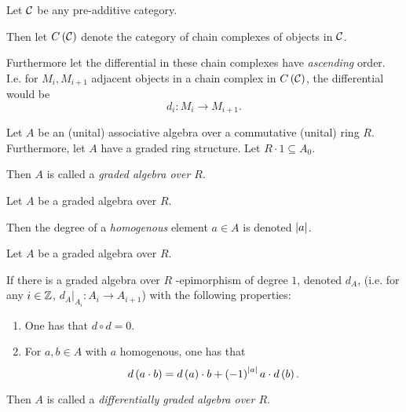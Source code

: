 \begin{notation}
    Let \( {\mathcal{C}} \) be any pre-additive category.
    
    Then let \( C \left( {\mathcal{C}} \right) \) denote the category of chain complexes of objects in \( {\mathcal{C}} \).

    Furthermore let the differential in these chain complexes have \emph{ascending} order. I.e. for \( M_i, M_{i+1} \) adjacent objects in a chain complex in \( C \left( {\mathcal{C}} \right) \), the differential would be
    \[
        d_i : M_i \to M_{i + 1}.
    \]
\end{notation}

\begin{definition}
    Let \( A \) be an (unital) associative algebra over a commutative (unital) ring \( R \). Furthermore, let \( A \) have a graded ring structure. Let \( R \cdot 1 \subseteq A_0 \).

    Then \( A \) is called a \emph{graded algebra over \( R \)}.
\end{definition}

\begin{notation}
    Let \( A \) be a graded algebra over \( R \).

    Then the degree of a \emph{homogenous} element \( a \in A \) is denoted \emph{\( \lvert a \rvert \)}.
\end{notation}

\begin{definition}
    Let \( A \) be a graded algebra over \( R \).

    If there is a graded algebra over \( R \) -epimorphism of degree \( 1 \), denoted \( d_A \), (i.e. for any \( i \in {\mathbb{Z}} \), \( d_A |_{A_i}: A_i \to A_{i + 1} \))
    with the following properties:
    \begin{enumerate}
        \item One has that \( d \circ d = 0 \).
        \item {
            For \( a, b \in A \) with \( a \) homogenous, one has that
            \[
                d\left( a \cdot b \right)
                =
                d\left( a \right) \cdot b + \left( -1 \right)^{\lvert a \rvert}a \cdot d\left( b \right).
            \]
            }
    \end{enumerate}

    Then \( A \) is called a \emph{differentially graded algebra over \( R \)}.
\end{definition}

